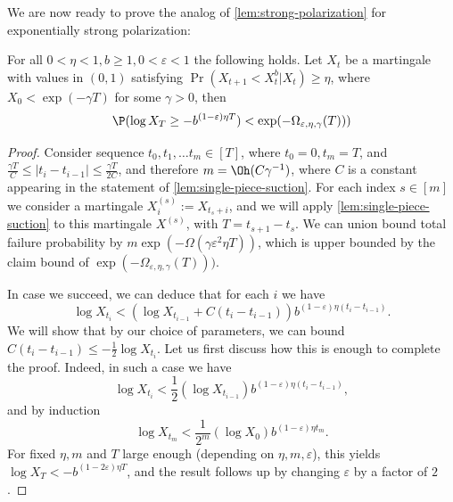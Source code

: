 \documentclass[11pt]{article}
\begin{document}
We are now ready to prove the analog of \cref{lem:strong-polarization} for exponentially strong polarization:
\begin{lemma}
	\label{lem:second-phase}
	For all $0<\eta<1, b\ge 1, 0<\varepsilon<1$ 
	the following holds. Let $X_t$ be a martingale with values in $(0, 1)$ satisfying $\Pr(X_{t+1} < X_t^{b} | X_t) \geq \eta$, where $X_0 < \exp(- \gamma T)$ for some $\gamma>0$, then
	\begin{equation*}
		\P(\log X_T \ge -b^{(1 - \varepsilon) \eta T}) < \exp(-\Omega_{\varepsilon,\eta,\gamma}(T)))
	\end{equation*}
\end{lemma}
\begin{proof}
	Consider sequence $t_0, t_1, \ldots t_m \in [T]$, where $t_0 = 0, t_m = T$, and $\frac{\gamma T}{C} \leq |t_i - t_{i-1}| \leq \frac{\gamma T }{2C}$, and therefore $m = \Oh(C \gamma^{-1})$, where $C$ is a constant appearing in the statement of \cref{lem:single-piece-suction}. For each index $s \in [m]$ we consider a martingale $X^{(s)}_i := X_{t_s + i}$, and we will apply \cref{lem:single-piece-suction} 
	to this martingale $X^{(s)}$, with $T = t_{s+1} - t_s$. We can union bound total failure probability by $m \exp(-\Omega(\gamma \varepsilon^2 \eta T))$, which is upper bounded by the claim bound of $\exp(-\Omega_{\varepsilon,\eta,\gamma}(T)))$. 
	
	In case we succeed, we can deduce that for each $i$ we have
	\begin{equation}
		\label{eq:lucky-event}
		\log X_{t_i} < (\log X_{t_{i-1}} + C(t_i - t_{i-1})) b^{(1-\varepsilon)\eta (t_{i} - t_{i-1})}. 
	\end{equation}
	We will show that by our choice of parameters, we can bound $C(t_i - t_{i-1}) \leq -\frac{1}{2} \log X_{t_i}$. Let us first discuss how this is enough to complete the proof. Indeed, in such a case we have
	\begin{equation}
		\log X_{t_i} < \frac{1}{2} (\log X_{t_{i-1}}) b^{(1 - \varepsilon) \eta (t_{i} - t_{i-1})}, 
		\label{eq:inductive-step}
	\end{equation}
	and by induction
	\begin{equation*}
		\log X_{t_m} < \frac{1}{2^m} (\log X_{0}) b^{(1-\varepsilon) \eta t_m}.
	\end{equation*}
	For fixed $\eta, m$ and $T$ large enough (depending on $\eta, m, \varepsilon$), this yields $\log X_T < - b^{(1 - 2\varepsilon) \eta T}$, and the result follows up by changing $\varepsilon$ by a factor of $2$.
	

\end{proof}
\end{document}

